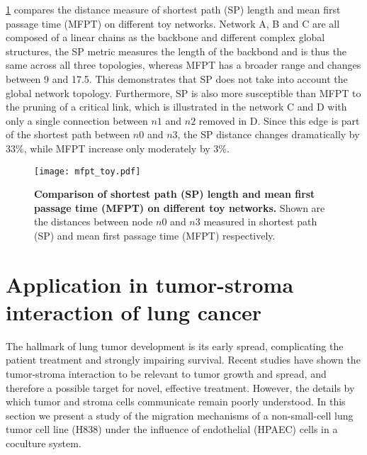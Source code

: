 \ref{fig:mfpt_toy} compares the distance measure of shortest path (SP) length
and mean first passage time (MFPT) on different toy networks. Network A, B and
C are all composed of a linear chains as the backbone and different complex 
global structures, the SP metric measures the length of the backbond and is 
thus the same across all three topologies, whereas MFPT has a broader range
and changes between 9 and 17.5. This demonstrates that SP does not take into
account the global network topology. Furthermore, SP is also more susceptible
than MFPT to the pruning of a critical link, which is illustrated in the 
network C and D with only a single connection between $n1$ and $n2$ removed
in D. Since this edge is part of the shortest path between $n0$ and $n3$, the
SP distance changes dramatically by 33\%, while MFPT increase only moderately
by 3\%.

\begin{figure}[!ht]
\begin{center}
\texttt{[image: mfpt\_toy.pdf]}
\end{center}
\caption[Toy example of SP and MFPT on different topologies]{
{\bf Comparison of shortest path (SP) length and mean first passage time 
(MFPT) on different toy networks.}
Shown are the distances between node $n0$ and $n3$ measured in shortest path 
(SP) and mean first passage time (MFPT) respectively.
}
\label{fig:mfpt_toy}
\end{figure}

\section{Application in tumor-stroma interaction of lung cancer}

The hallmark of lung tumor development is its early spread, 
complicating the patient treatment and strongly impairing survival.
Recent studies have shown the tumor-stroma interaction to be relevant to 
tumor growth and spread, and therefore a possible target for
novel, effective treatment. 
However, 
the details by which tumor and stroma cells communicate remain poorly 
understood. In this section we present a study
of the migration mechanisms of a non-small-cell lung 
tumor cell line (H838) under the influence of endothelial (HPAEC) cells 
in a coculture system.

